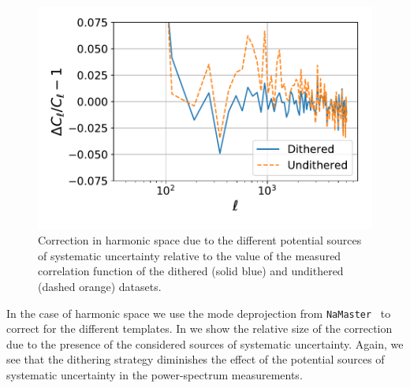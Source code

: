 \documentclass[\docopts]{\docclass}
\begin{document}
\begin{figure}
\centering
\includegraphics[width=0.9\columnwidth]{Cl_25p3_sys_comparison}
\caption{Correction in harmonic space due to the different potential sources of systematic uncertainty relative to the value of the measured correlation function of the dithered (solid blue) and undithered (dashed orange) datasets.}
\label{fig:sys_harmonic_space}
\end{figure}


In the case of harmonic space we use the mode deprojection from \texttt{NaMaster}~\citep{Namaster} to correct for the different templates. In  we show the relative size of the correction due to the presence of the considered sources of systematic uncertainty. Again, we see that the dithering strategy diminishes the effect of the potential sources of systematic uncertainty in the power-spectrum measurements.



\end{document}
